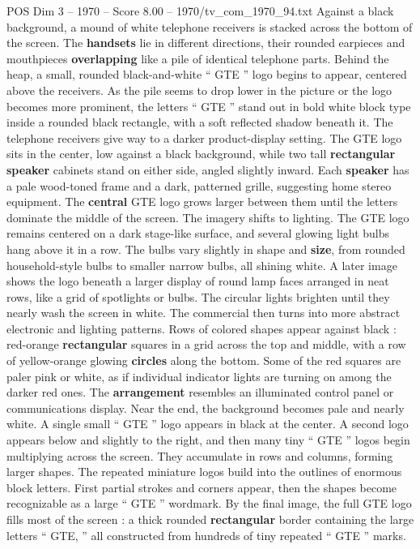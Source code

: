 \begin{textsample}{POS Dim 3 – 1970 – Score 8.00 – 1970/tv\_com\_1970\_94.txt}  \label{ex:f3_pos_035}
Against a black background, a mound of white telephone receivers is stacked across the bottom of the screen.
The \textbf{handsets} lie in different directions, their rounded earpieces and mouthpieces \textbf{overlapping} like a pile of identical telephone parts.
Behind the heap, a small, rounded black-and-white “ GTE ” logo begins to appear, centered above the receivers.
As the pile seems to drop lower in the picture or the logo becomes more prominent, the letters “ GTE ” stand out in bold white block type inside a rounded black rectangle, with a soft reflected shadow beneath it.
The telephone receivers give way to a darker product-display setting.
The GTE logo sits in the center, low against a black background, while two tall \textbf{rectangular} \textbf{speaker} cabinets stand on either side, angled slightly inward.
Each \textbf{speaker} has a pale wood-toned frame and a dark, patterned grille, suggesting home stereo equipment.
The \textbf{central} GTE logo grows larger between them until the letters dominate the middle of the screen.
The imagery shifts to lighting.
The GTE logo remains centered on a dark stage-like surface, and several glowing light bulbs hang above it in a row.
The bulbs vary slightly in shape and \textbf{size}, from rounded household-style bulbs to smaller narrow bulbs, all shining white.
A later image shows the logo beneath a larger display of round lamp faces arranged in neat rows, like a grid of spotlights or bulbs.
The circular lights brighten until they nearly wash the screen in white.
The commercial then turns into more abstract electronic and lighting patterns.
Rows of colored shapes appear against black : red-orange \textbf{rectangular} squares in a grid across the top and middle, with a row of yellow-orange glowing \textbf{circles} along the bottom.
Some of the red squares are paler pink or white, as if individual indicator lights are turning on among the darker red ones.
The \textbf{arrangement} resembles an illuminated control panel or communications display.
Near the end, the background becomes pale and nearly white.
A single small “ GTE ” logo appears in black at the center.
A second logo appears below and slightly to the right, and then many tiny “ GTE ” logos begin multiplying across the screen.
They accumulate in rows and columns, forming larger shapes.
The repeated miniature logos build into the outlines of enormous block letters.
First partial strokes and corners appear, then the shapes become recognizable as a large “ GTE ” wordmark.
By the final image, the full GTE logo fills most of the screen : a thick rounded \textbf{rectangular} border containing the large letters “ GTE, ” all constructed from hundreds of tiny repeated “ GTE ” marks.

\end{textsample}
